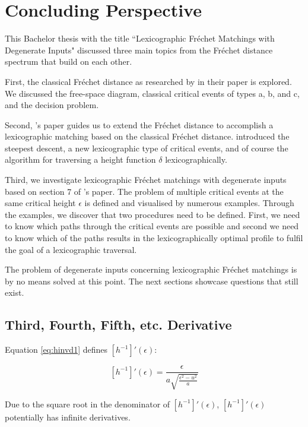 \section{Concluding Perspective}
	This Bachelor thesis with the title ``Lexicographic Fréchet Matchings with Degenerate Inputs" discussed three main topics from the Fréchet distance spectrum that build on each other.
	
	First, the classical Fréchet distance as researched by \citeauthor{altgodau} in their \citeyear{altgodau} paper \cite{altgodau} is explored. We discussed the free-space diagram, classical critical events of types a, b, and c, and the decision problem.
	
	Second, \citeauthor{rotelex}'s \citeyear{rotelex} paper \cite{rotelex} guides us to extend the Fréchet distance to accomplish a lexicographic matching based on the classical Fréchet distance. \citeauthor{rotelex} introduced the steepest descent, a new lexicographic type of critical events, and of course the algorithm for traversing a height function $\delta$ lexicographically.
	
	Third, we investigate lexicographic Fréchet matchings with degenerate inputs based on section 7 of \citeauthor{rotelex}'s paper\cite{rotelex}. The problem of multiple critical events at the same critical height $\epsilon$ is defined and visualised by numerous examples. Through the examples, we discover that two procedures need to be defined. First, we need to know which paths through the critical events are possible and second we need to know which of the paths results in the lexicographically optimal profile to fulfil the goal of a lexicographic traversal.
	
	The problem of degenerate inputs concerning lexicographic Fréchet matchings is by no means solved at this point. The next sections showcase questions that still exist.
	
\subsection{Third, Fourth, Fifth, etc. Derivative}

Equation \ref{eq:hinvd1} defines $[h^{-1}]'(\epsilon)$:

$$[h^{-1}]'(\epsilon) = \frac{ \epsilon }{ a\sqrt{\frac{\epsilon^2 - u^2}{a}} }$$

Due to the square root in the denominator of $[h^{-1}]'(\epsilon)$, $[h^{-1}]'(\epsilon)$ potentially has infinite derivatives.

